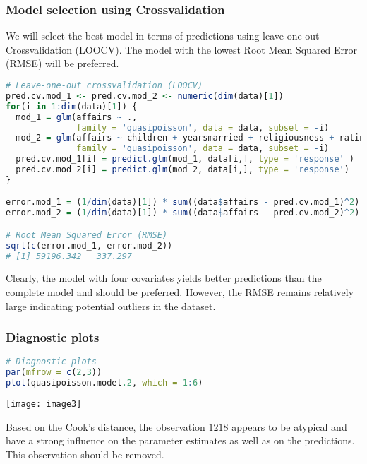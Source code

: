\documentclass[border=5mm, convert, usenames, dvipsnames,beamer]{standalone}
\begin{document}
\begin{frame}[ fragile]{}
\frametitle{Model selection using Crossvalidation}

\footnotesize
\vspace{15mm}
\noindent
We will select the best model in terms of predictions using {\color{purple}leave-one-out Crossvalidation (LOOCV)}. The model with the lowest Root Mean Squared Error (RMSE) will be preferred. 

\par


\tiny
\begin{lstlisting}[language=R]
# Leave-one-out crossvalidation (LOOCV)
pred.cv.mod_1 <- pred.cv.mod_2 <- numeric(dim(data)[1])
for(i in 1:dim(data)[1]) {
  mod_1 = glm(affairs ~ .,
              family = 'quasipoisson', data = data, subset = -i)
  mod_2 = glm(affairs ~ children + yearsmarried + religiousness + rating,
              family = 'quasipoisson', data = data, subset = -i)
  pred.cv.mod_1[i] = predict.glm(mod_1, data[i,], type = 'response' )
  pred.cv.mod_2[i] = predict.glm(mod_2, data[i,], type = 'response')
}

error.mod_1 = (1/dim(data)[1]) * sum((data$affairs - pred.cv.mod_1)^2) 
error.mod_2 = (1/dim(data)[1]) * sum((data$affairs - pred.cv.mod_2)^2) 

# Root Mean Squared Error (RMSE)
sqrt(c(error.mod_1, error.mod_2))
# [1] 59196.342   337.297
\end{lstlisting}
\par

\footnotesize
\noindent
{\color{purple}Clearly, the model with four covariates yields better predictions than the complete model and should be preferred.} However, the RMSE remains relatively large indicating potential outliers in the dataset.
\par
\end{frame}




\begin{frame}[ fragile]{}
\frametitle{Diagnostic plots}

\footnotesize
\vspace{10mm}
\noindent

\par


\tiny
\begin{lstlisting}[language=R]
# Diagnostic plots
par(mfrow = c(2,3))
plot(quasipoisson.model.2, which = 1:6)
\end{lstlisting}
\par

\vspace{-5}
\noindent
 \texttt{[image: image3]}


\footnotesize
\noindent
Based on the {\color{purple}Cook's distance}, the observation $1218$ appears to be atypical and have a strong influence on the parameter estimates as well as on the predictions. This observation should be removed.
\par

\end{frame}
\end{document}
